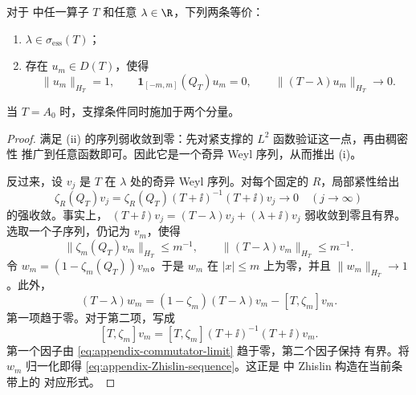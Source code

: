 \begin{lemma}
\label{lem:appendix-Zhislin}
对于  中任一算子 $T$ 和任意
$\lambda\in\R$，下列两条等价：
\begin{enumerate}[label=\textup{(\roman*)},leftmargin=*]
  \item $\lambda\in\sigma_{\mathrm{ess}}(T)$；
  \item 存在 $u_m\in D(T)$，使得
  \begin{equation}
    \|u_m\|_{H_T}=1,\qquad
    \mathbf 1_{[-m,m]}(Q_T)u_m=0,\qquad
    \|(T-\lambda)u_m\|_{H_T}\longrightarrow0.
    \label{eq:appendix-Zhislin-sequence}
  \end{equation}
\end{enumerate}
当 $T=A_0$ 时，支撑条件同时施加于两个分量。
\end{lemma}
\begin{proof}
满足 (ii) 的序列弱收敛到零：先对紧支撑的 $L^2$ 函数验证这一点，再由稠密性
推广到任意函数即可。因此它是一个奇异 Weyl 序列，从而推出 (i)。

反过来，设 $v_j$ 是 $T$ 在 $\lambda$ 处的奇异 Weyl 序列。对每个固定的
$R$，局部紧性给出
\[
  \zeta_R(Q_T)v_j
  =\zeta_R(Q_T)(T+\ii)^{-1}(T+\ii)v_j
  \longrightarrow0
  \quad(j\to\infty)
\]
的强收敛。事实上，
$(T+\ii)v_j=(T-\lambda)v_j+(\lambda+\ii)v_j$ 弱收敛到零且有界。
选取一个子序列，仍记为 $v_m$，使得
\[
  \|\zeta_m(Q_T)v_m\|_{H_T}\leq m^{-1},\qquad
  \|(T-\lambda)v_m\|_{H_T}\leq m^{-1}.
\]
令 $w_m=(1-\zeta_m(Q_T))v_m$。于是 $w_m$ 在 $|x|\leq m$ 上为零，并且
$\|w_m\|_{H_T}\to1$。此外，
\[
  (T-\lambda)w_m
  =(1-\zeta_m)(T-\lambda)v_m-[T,\zeta_m]v_m.
\]
第一项趋于零。对于第二项，写成
\[
  [T,\zeta_m]v_m
  =[T,\zeta_m](T+\ii)^{-1}(T+\ii)v_m.
\]
第一个因子由 \eqref{eq:appendix-commutator-limit} 趋于零，第二个因子保持
有界。将 $w_m$ 归一化即得 \eqref{eq:appendix-Zhislin-sequence}。这正是
\cite[Lemmas~3.11--3.12]{DeNittisEtAl2021} 中 Zhislin 构造在当前条带上的
对应形式。
\end{proof}

